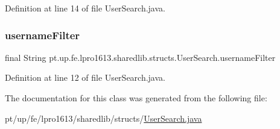 Definition at line 14 of file User\+Search.\+java.

\hypertarget{classpt_1_1up_1_1fe_1_1lpro1613_1_1sharedlib_1_1structs_1_1_user_search_adf37317dd0f8e847ab2500c5a6e71beb}{}\label{classpt_1_1up_1_1fe_1_1lpro1613_1_1sharedlib_1_1structs_1_1_user_search_adf37317dd0f8e847ab2500c5a6e71beb} 
\subsubsection{\texorpdfstring{username\+Filter}{usernameFilter}}
{\footnotesize\ttfamily final String pt.\+up.\+fe.\+lpro1613.\+sharedlib.\+structs.\+User\+Search.\+username\+Filter}



Definition at line 12 of file User\+Search.\+java.



The documentation for this class was generated from the following file\+:\begin{DoxyCompactItemize}
\item 
pt/up/fe/lpro1613/sharedlib/structs/\hyperlink{_user_search_8java}{User\+Search.\+java}\end{DoxyCompactItemize}

